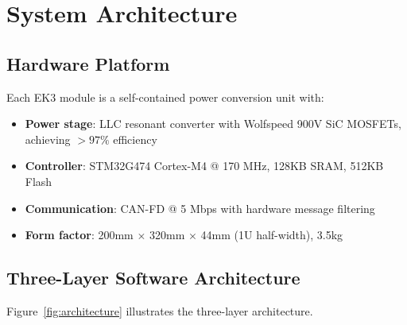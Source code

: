 \documentclass[conference,10pt]{IEEEtran}
\begin{document}
\section{System Architecture}
\label{sec:architecture}

\subsection{Hardware Platform}

Each EK3 module is a self-contained power conversion unit with:
\begin{itemize}
    \item \textbf{Power stage}: LLC resonant converter with Wolfspeed 900V SiC MOSFETs, achieving $>97\%$ efficiency
    \item \textbf{Controller}: STM32G474 Cortex-M4 @ 170 MHz, 128KB SRAM, 512KB Flash
    \item \textbf{Communication}: CAN-FD @ 5 Mbps with hardware message filtering
    \item \textbf{Form factor}: 200mm $\times$ 320mm $\times$ 44mm (1U half-width), 3.5kg
\end{itemize}

\subsection{Three-Layer Software Architecture}

Figure~\ref{fig:architecture} illustrates the three-layer architecture.
\end{document}
